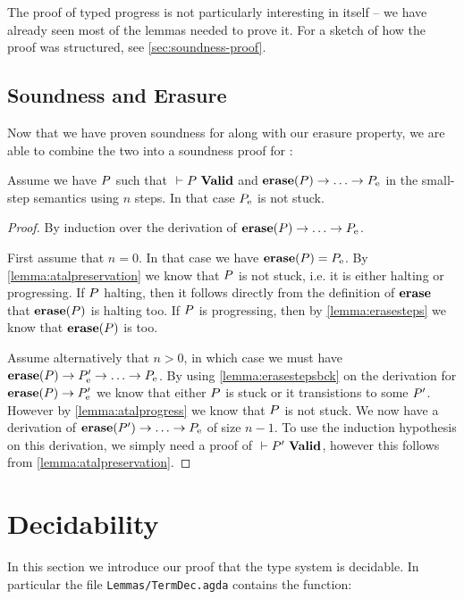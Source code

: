 The proof of typed progress is not particularly interesting in itself -- we have
already seen most of the lemmas needed to prove it. For a sketch of how the
proof was structured, see \cref{sec:soundness-proof}.

\subsection{Soundness and Erasure}

Now that we have proven soundness for \ATAL along with our erasure property, we
are able to combine the two into a soundness proof for \ATALe:

\begin{theorem}
  Assume we have $P$ such that ${} |- {P}\ \mathbf{Valid}$ and
  ${\mathbf{erase}}(P) -> \dots -> P_{\mathrm{e}}$ in the \ATALe small-step semantics
  using $n$ steps. In that case $P_{\mathrm{e}}$ is not stuck.
\end{theorem}
\begin{proof}
  By induction over the derivation of ${\mathbf{erase}}(P) -> \dots -> P_{\mathrm{e}}$.

  First assume that $n=0$. In that case we have ${\mathbf{erase}}(P) =
  P_{\mathrm{e}}$. By \cref{lemma:atalpreservation} we know that $P$ is not
  stuck, i.e. it is either halting or progressing. If $P$ halting, then it
  follows directly from the definition of ${\mathbf{erase}}$ that ${\mathbf{erase}}(P)$ is
  halting too. If $P$ is progressing, then by \cref{lemma:erasesteps} we
  know that ${\mathbf{erase}}(P)$ is too.

  Assume alternatively that $n>0$, in which case we must have
  ${\mathbf{erase}}(P) -> P'_{\mathrm{e}} -> \dots -> P_{\mathrm{e}}$. By using
  \cref{lemma:erasestepsbck} on the derivation for
  ${\mathbf{erase}}(P) -> P'_{\mathrm{e}}$ we know that either $P$ is stuck or it
  transistions to some $P'$. However by \cref{lemma:atalprogress} we know
  that $P$ is not stuck. We now have a derivation of
  ${\mathbf{erase}}(P') -> \dots -> P_{\mathrm{e}}$ of size $n-1$. To use the induction
  hypothesis on this derivation, we simply need a proof of ${} |- {P'}\ \mathbf{Valid}$,
  however this follows from \cref{lemma:atalpreservation}.
\end{proof}

\section{Decidability}

In this section we introduce our proof that the type system is decidable. In
particular the file \texttt{Lemmas/TermDec.agda} contains the function:

